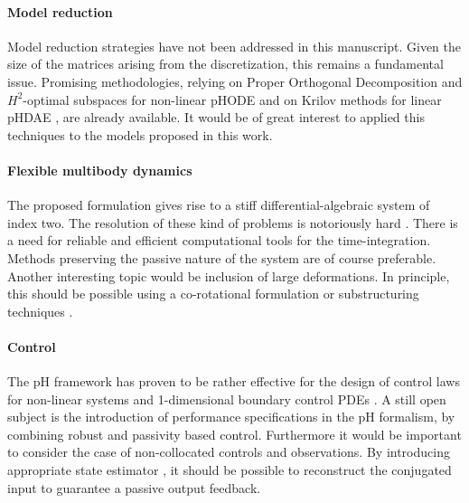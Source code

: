 \paragraph{Model reduction}
Model reduction strategies have not been addressed in this manuscript. Given the size of the matrices arising from the discretization, this remains a fundamental issue. Promising methodologies, relying on Proper Orthogonal Decomposition and $H^2$-optimal subspaces for non-linear pHODE \cite{chaturantabut2016} and on Krilov methods for linear pHDAE \cite{egger2018}, are already available. It would be of great interest to applied this techniques to the models proposed in this work.

\paragraph{Flexible multibody dynamics}
The proposed formulation gives rise to a stiff differential-algebraic system of index two. The resolution of these kind of problems is notoriously hard \cite{brenan1995dae}. There is a need for reliable and efficient computational tools for the time-integration. Methods preserving the passive nature of the system are of course preferable. \\ Another interesting topic would be inclusion of large deformations. In principle, this should be possible using a co-rotational formulation or substructuring techniques \cite{wu1988substructuring}.

\paragraph{Control}
The pH framework has proven to be rather effective for the design of control laws for non-linear systems \cite{ortega2004survey} and 1-dimensional boundary control PDEs \cite{macchelli2020exponential}. A still open subject is the introduction of performance specifications in the pH formalism,  by combining robust and passivity based control. Furthermore it would be important to consider the case of non-collocated controls and observations. By introducing appropriate state estimator \cite{yaghmaei2019}, it should be possible to reconstruct the conjugated input to guarantee a passive output feedback.


